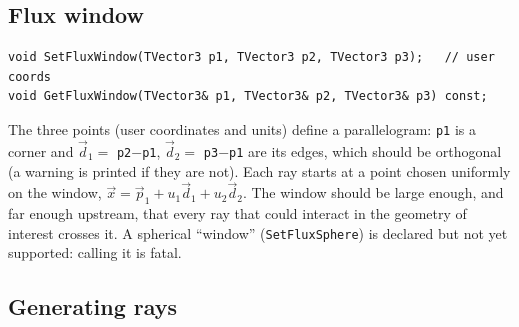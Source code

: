 \documentclass[11pt]{article}
\newcommand{\code}[1]{\texttt{#1}}
\begin{document}
\subsection{Flux window}\label{sec:genie-window}

\begin{lstlisting}[style=cxx,numbers=none]
void SetFluxWindow(TVector3 p1, TVector3 p2, TVector3 p3);   // user coords
void GetFluxWindow(TVector3& p1, TVector3& p2, TVector3& p3) const;
\end{lstlisting}
The three points (user coordinates and units) define a parallelogram:
\code{p1} is a corner and $\vec d_1 = $ \code{p2}$-$\code{p1},
$\vec d_2 = $ \code{p3}$-$\code{p1} are its edges, which should be
orthogonal (a warning is printed if they are not).  Each ray starts at a
point chosen uniformly on the window,
$\vec x = \vec p_1 + u_1\vec d_1 + u_2\vec d_2$.  The window should be
large enough, and far enough upstream, that every ray that could interact
in the geometry of interest crosses it.  A spherical ``window''
(\code{SetFluxSphere}) is declared but not yet supported: calling it is
fatal.

\subsection{Generating rays}\label{sec:genie-gen}
\end{document}
